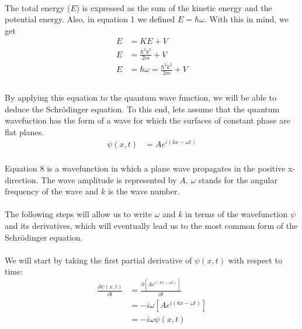 \documentclass[letter]{article}
\begin{document}
\begin{enumerate}
    \paragraph{} The total energy ($E$) is expressed as the sum of the kinetic energy and the potential energy. Also, in equation 1 we defined $E=\hbar \omega$. With this in mind, we get
    \begin{equation}
        \begin{split}
            E   &= KE+V\\
            E   &=\frac{\hbar^2 k^2}{2m}+V\\
            E   &= \hbar \omega = \frac{\hbar^2 k^2}{2m}+V\\
        \end{split}
    \end{equation}
    \paragraph{} By applying this equation to the quantum wave function, we will be able to deduce the Schrödinger equation. To this end, lets assume that the quantum wavefuction has the form of a wave for which the surfaces of constant phase are flat planes. 
    \begin{equation}
        \begin{split}
            \psi(x,t) &= Ae^{i(kx-\omega t)}
        \end{split}
    \end{equation}
    \paragraph{}Equation 8 is a wavefunction in which a plane wave propagates in the positive x-direction. The wave amplitude is represented by $A$, $\omega$ stands for the angular frequency of the wave and $k$ is the wave number.
    \paragraph{} The following steps will allow us to write $\omega$ and $k$ in terms of the wavefunction $\psi$ and its derivatives, which will eventually lead us to the most common form of the Schrödinger equation. 
    \paragraph{}We will start by taking the first partial derivative of $\psi(x,t)$ with respect to time:
    \begin{equation}
        \begin{split}
            \frac{\partial \psi(x,t)}{\partial t} 
            &= \frac{\partial [Ae^{i(kx-\omega t)}]}{\partial t}\\
            &= -i\omega[Ae^{i(kx-\omega t)}]\\
            &= -i\omega \psi(x,t)\\
        \end{split}
    \end{equation}

\end{enumerate}
\end{document}

